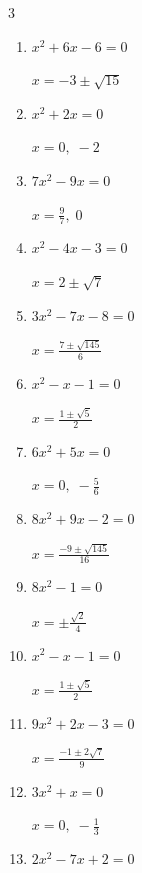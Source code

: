 \begin{multicols}{3}
\begin{enumerate}
        $\displaystyle x=\frac{1\pm \sqrt{21}}{5}$

  \item $x^{2}+6x-6=0$

        $\displaystyle x=-3\pm \sqrt{15}$

\columnbreak %

  \item $x^{2}+2x=0$

        $\displaystyle x=0, \; -2$

  \item $7x^{2}-9x=0$

        $\displaystyle x=\frac{9}{7}, \; 0$

  \item $x^{2}-4x-3=0$

        $\displaystyle x=2\pm \sqrt{7}$

  \item $3x^{2}-7x-8=0$

        $\displaystyle x=\frac{7\pm \sqrt{145}}{6}$

  \item $x^{2}-x-1=0$

        $\displaystyle x=\frac{1\pm \sqrt{5}}{2}$

  \item $6x^{2}+5x=0$

        $\displaystyle x=0, \; -\frac{5}{6}$

  \item $8x^{2}+9x-2=0$

        $\displaystyle x=\frac{-9\pm \sqrt{145}}{16}$

\columnbreak %

\resetques

  \item $8x^{2}-1=0$

        $\displaystyle x=\pm \frac{\sqrt{2}}{4}$

  \item $x^{2}-x-1=0$

        $\displaystyle x=\frac{1\pm \sqrt{5}}{2}$

  \item $9x^{2}+2x-3=0$

        $\displaystyle x=\frac{-1\pm 2\sqrt{7}}{9}$

  \item $3x^{2}+x=0$

        $\displaystyle x=0, \; -\frac{1}{3}$

  \item $2x^{2}-7x+2=0$


\end{enumerate}
\end{multicols}
